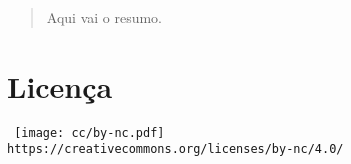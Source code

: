 
\thispagestyle{empty} %
\flushbottom %
\maketitle %


\begin{abstract}
    Aqui vai o resumo.
\end{abstract}


\section*{Licença}

    \scriptsize\noindent%
    \begin{minipage}{\columnwidth}
        \centering\tt
        \texttt{[image: cc/by-nc.pdf]}\\[0.5\smallskipamount]
        {\scriptsize\texttt{https://creativecommons.org/licenses/by-nc/4.0/}}
    \end{minipage}
    \normalsize



